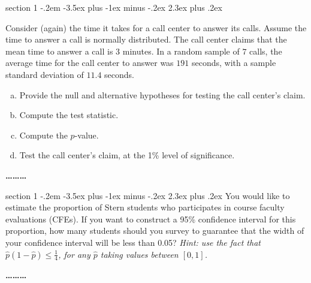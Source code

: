 \documentclass[11pt]{exam}
\makeatletter
\newcommand{\h}{\widehat}
\newenvironment{problem}{\@startsection
       {section}
       {1}
       {-.2em}
       {-3.5ex plus -1ex minus -.2ex}
       {2.3ex plus .2ex}
       {\pagebreak[3]%
       \large\bf\noindent{Problem }
       }
       }
       {%
       \begin{center}\large\bf \ldots\ldots\ldots\end{center}}
\makeatother
\begin{document}
\begin{problem}{}

Consider (again) the time it takes for a call center to answer its calls. Assume the 
time to answer a call is normally distributed.  
The call center claims that the mean time to answer a call is $3$ minutes.  In a
random sample of $7$ calls, the average time for the call center to answer was
$191$ seconds, with a sample standard deviation of $11.4$ seconds.

\begin{enumerate}[(a)]


\item Provide the null and alternative hypotheses for testing the call
center's claim.

\item Compute the test statistic.

\item Compute the $p$-value.

\item Test the call center's claim, at the 1\% level of significance.

\end{enumerate}

\end{problem}



\begin{problem}{}
    You would like to estimate the proportion of Stern students who participates in course faculty evaluations (CFEs). 
    If you want to construct a 95\% confidence interval for this proportion, how many students should you survey 
    to guarantee that the width of your confidence interval will be less than 0.05?
    \textit{Hint: use the fact that $\h p (1-\h p) \leq \frac{1}{4}$, for any $\h p$ taking values between $[0,1]$.}
\end{problem}
\end{document}
